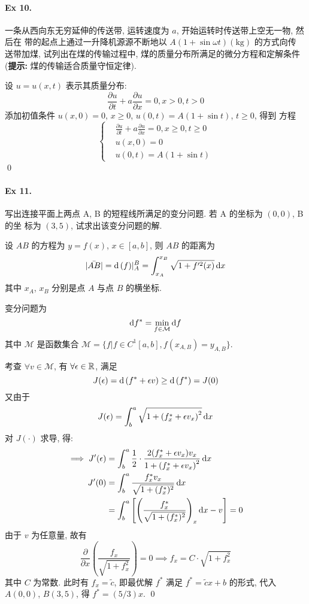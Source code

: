 \paragraph{Ex 10.}
一条从西向东无穷延伸的传送带, 运转速度为 $a$, 开始运转时传送带上空无一物, 然后在
带的起点上通过一升降机源源不断地以 $A (1 + \sin \omega t)(\text{kg})$ 的方式向传
送带加煤, 试列出在煤的传输过程中, 煤的质量分布所满足的微分方程和定解条件
({\bf 提示:} 煤的传输适合质量守恒定律).

\solution 设 $u = u(x, t)$ 表示其质量分布:
\[
\frac{\partial u}{\partial t} + a\frac{\partial u}{\partial x} = 0, x > 0, t > 0
\]
添加初值条件 $u(x, 0) = 0$, $x \geq 0$, $u(0, t) = A(1+\sin t)$, $t\geq 0$, 得到
方程
\[ \left\{ \begin{aligned} 
&\frac{\partial u}{\partial t} + a\frac{\partial u}{\partial x} = 0,
  x \geq 0, t \geq 0 \\
&u(x, 0) = 0 \\
&u(0, t) = A(1+\sin t)
\end{aligned} \right. \]
\qed

\paragraph{Ex 11.}
写出连接平面上两点 A, B 的短程线所满足的变分问题. 若 A 的坐标为 $(0, 0)$, B 的坐
标为 $(3, 5)$, 试求出该变分问题的解.

\solution 设 $AB$ 的方程为 $y = f(x)$, $x \in [a, b]$, 则 $AB$ 的距离为
\[
|\bar{AB}| = \operatorname{d\!}\ (f)|_A^B = \int_{x_A}^{x_B} \sqrt{1 + f'^2(x)} \operatorname{d\!} x
\]
其中 $x_A$, $x_B$ 分别是点 $A$ 与点 $B$ 的横坐标.

变分问题为 
\[
\operatorname{d\!} f^* = \min_{f \in \mathcal M} \operatorname{d\!} f
\]
其中 $\mathcal M$ 是函数集合
$\mathcal M = \{f | f \in C^1[a, b], f(x_{A, B}) = y_{A, B}\}$.

考查 $\forall v \in \mathcal M$, 有 $\forall \epsilon \in {\mathbb R}$, 满足
\[
J(\epsilon) = \operatorname{d\!}\ (f^* + \epsilon v) \geq \operatorname{d\!}\ (f^*) = J(0)
\]
又由于
\[
J(\epsilon) = \int_b^a \sqrt{1 + \left(f^*_x + \epsilon v_x\right)^2} \operatorname{d\!} x
\]
对 $J(\cdot)$ 求导, 得:
\[ \begin{aligned}
\implies J'(\epsilon)
&= \int_b^a \frac{1}{2} \cdot
  \frac{2 (f^*_x + \epsilon v_x) v_x}{1 + \left(f^*_x + \epsilon v_x\right)^2}
  \operatorname{d\!} x \\
J'(0) &= \int_b^a
  \frac{f^*_x v_x}{\sqrt{1 + (f^*_x)^2}} \operatorname{d\!} x \\
&= \int_b^a
  \left[ \left( \frac{f^*_x}{\sqrt{1 + (f^*_x)^2}} \right)_x \operatorname{d\!} x - v \right]
  = 0
\end{aligned} \]
由于 $v$ 为任意量, 故有
\[
\frac{\partial}{\partial x}\left( \frac{f_x}{\sqrt{1 + f_x^2}} \right) = 0
\implies f_x = C \cdot \sqrt{1 + f_x^2}
\]
其中 $C$ 为常数. 此时有 $f_x = \tilde c$, 即最优解 $f^*$ 满足
$f^* = \tilde c x + b$ 的形式, 代入 $A(0, 0)$, $B(3, 5)$, 得 $f^* = (5 / 3) x$.
\qed

